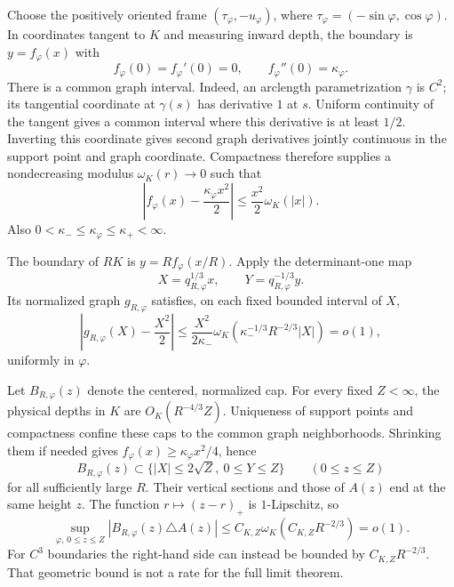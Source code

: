 \documentclass[11pt,a4paper]{article}
\theoremstyle{remark}\newtheorem{remark}{Remark}
\numberwithin{equation}{section}
\begin{document}
Choose the positively oriented frame $(\tau_\varphi,-u_\varphi)$, where $\tau_\varphi=(-\sin\varphi,\cos\varphi)$. In coordinates tangent to $K$ and measuring inward depth, the boundary is $y=f_\varphi(x)$ with
\[
 f_\varphi(0)=f_\varphi'(0)=0,\qquad f_\varphi''(0)=\kappa_\varphi.
\]
There is a common graph interval. Indeed, an arclength parametrization $\gamma$ is $C^2$; its tangential coordinate at $\gamma(s)$ has derivative $1$ at $s$. Uniform continuity of the tangent gives a common interval where this derivative is at least $1/2$. Inverting this coordinate gives second graph derivatives jointly continuous in the support point and graph coordinate. Compactness therefore supplies a nondecreasing modulus $\omega_K(r)\to0$ such that
\begin{equation}\label{eq:c2}
 \left|f_\varphi(x)-\frac{\kappa_\varphi x^2}{2}\right|
 \le\frac{x^2}{2}\omega_K(|x|).
\end{equation}
Also $0<\kappa_-\le\kappa_\varphi\le\kappa_+<\infty$.

The boundary of $RK$ is $y=Rf_\varphi(x/R)$. Apply the determinant-one map
\begin{equation}\label{eq:scaling}
 X=q_{R,\varphi}^{1/3}x,\qquad Y=q_{R,\varphi}^{-1/3}y.
\end{equation}
Its normalized graph $g_{R,\varphi}$ satisfies, on each fixed bounded interval of $X$,
\begin{equation}\label{eq:graph}
 \left|g_{R,\varphi}(X)-\frac{X^2}{2}\right|
 \le\frac{X^2}{2\kappa_-}
 \omega_K\!\left(\kappa_-^{-1/3}R^{-2/3}|X|\right)=o(1),
\end{equation}
uniformly in $\varphi$.

Let $B_{R,\varphi}(z)$ denote the centered, normalized cap. For every fixed $Z<\infty$, the physical depths in $K$ are $O_K(R^{-4/3}Z)$. Uniqueness of support points and compactness confine these caps to the common graph neighborhoods. Shrinking them if needed gives $f_\varphi(x)\ge\kappa_\varphi x^2/4$, hence
\[
 B_{R,\varphi}(z)\subset\{|X|\le2\sqrt Z,\ 0\le Y\le Z\}\qquad(0\le z\le Z)
\]
for all sufficiently large $R$. Their vertical sections and those of $A(z)$ end at the same height $z$. The function $r\mapsto(z-r)_+$ is $1$-Lipschitz, so
\begin{equation}\label{eq:symdiff}
 \sup_{\varphi,\,0\le z\le Z}|B_{R,\varphi}(z)\triangle A(z)|
 \le C_{K,Z}\omega_K(C_{K,Z}R^{-2/3})=o(1).
\end{equation}
For $C^3$ boundaries the right-hand side can instead be bounded by $C_{K,Z}R^{-2/3}$. That geometric bound is not a rate for the full limit theorem.
\end{document}
